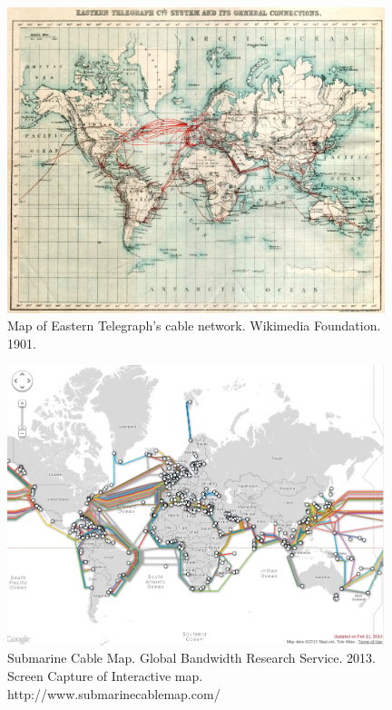 \documentclass[11pt]{article}
\begin{document}
\begin{figure}[ht!]
\center
\includegraphics[width=110mm]{1901_Eastern_Telegraph_cables.png}
\caption{Map of Eastern Telegraph's cable network. Wikimedia Foundation. 1901.}
\end{figure}

\begin{figure}[ht!]
\center
\includegraphics[width=110mm]{sub_cable_map.png}
\caption{Submarine Cable Map. Global Bandwidth Research Service. 2013. Screen Capture of Interactive map. http://www.submarinecablemap.com/}
\end{figure}
\end{document}
